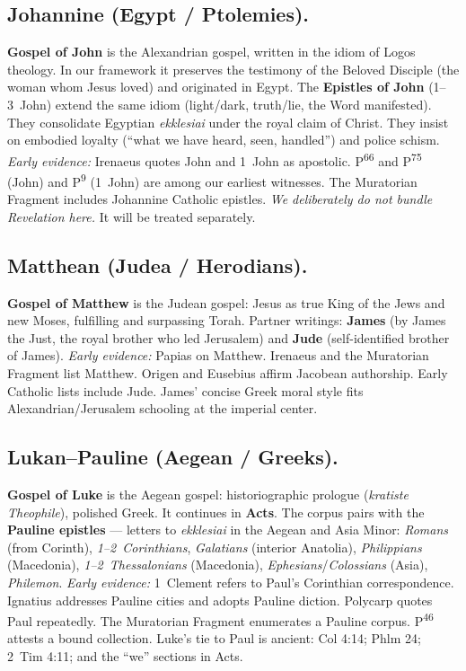 \subsection{Johannine (Egypt / Ptolemies).}
\textbf{Gospel of John} is the Alexandrian gospel, written in the idiom of Logos theology.
In our framework it preserves the testimony of the Beloved Disciple (the woman whom Jesus loved) and originated in Egypt.
The \textbf{Epistles of John} (1–3~John) extend the same idiom (light/dark, truth/lie, the Word manifested).
They consolidate Egyptian \textit{ekklesiai} under the royal claim of Christ.
They insist on embodied loyalty (“what we have heard, seen, handled”) and police schism.
\emph{Early evidence:} Irenaeus quotes John and 1~John as apostolic.
P\textsuperscript{66} and P\textsuperscript{75} (John) and P\textsuperscript{9} (1~John) are among our earliest witnesses.
The Muratorian Fragment includes Johannine Catholic epistles.
\emph{We deliberately do not bundle Revelation here.}
It will be treated separately.

\subsection{Matthean (Judea / Herodians).}
\textbf{Gospel of Matthew} is the Judean gospel: Jesus as true King of the Jews and new Moses, fulfilling and surpassing Torah.
Partner writings: \textbf{James} (by James the Just, the royal brother who led Jerusalem) and \textbf{Jude} (self-identified brother of James).
\emph{Early evidence:} Papias on Matthew.
Irenaeus and the Muratorian Fragment list Matthew.
Origen and Eusebius affirm Jacobean authorship.
Early Catholic lists include Jude.
James’ concise Greek moral style fits Alexandrian/Jerusalem schooling at the imperial center.

\subsection{Lukan–Pauline (Aegean / Greeks).}
\textbf{Gospel of Luke} is the Aegean gospel: historiographic prologue (\textit{kratiste Theophile}), polished Greek.
It continues in \textbf{Acts}.
The corpus pairs with the \textbf{Pauline epistles} — letters to \textit{ekklesiai} in the Aegean and Asia Minor: \textit{Romans} (from Corinth), \textit{1–2~Corinthians}, \textit{Galatians} (interior Anatolia), \textit{Philippians} (Macedonia), \textit{1–2~Thessalonians} (Macedonia), \textit{Ephesians}/\textit{Colossians} (Asia), \textit{Philemon}.
\emph{Early evidence:} 1~Clement refers to Paul’s Corinthian correspondence.
Ignatius addresses Pauline cities and adopts Pauline diction.
Polycarp quotes Paul repeatedly.
The Muratorian Fragment enumerates a Pauline corpus.
P\textsuperscript{46} attests a bound collection.
Luke’s tie to Paul is ancient: Col 4:14; Phlm 24; 2~Tim 4:11; and the “we” sections in Acts.

